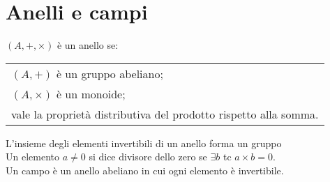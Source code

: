 \section{Anelli e campi}
$(A,+,\times)$ è un anello se:
\begin{tabular}{l}
$(A, +)$ è un gruppo abeliano; \\
$(A, \times)$ è un monoide; \\
vale la proprietà distributiva del prodotto rispetto alla somma. \\
\end{tabular}
L'insieme degli elementi invertibili di un anello forma un gruppo \\
Un elemento $a \neq 0$ si dice divisore dello zero se $\exists b$ tc $a \times b = 0$. \\
Un campo è un anello abeliano in cui ogni elemento è invertibile. \\